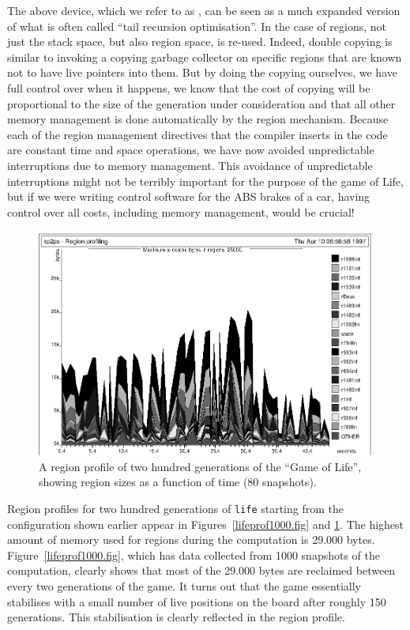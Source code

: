 \documentclass[12pt]{book}
\begin{document}
The above device, which we refer to as , can be seen as a much expanded version of what is
often called ``tail recursion optimisation''.  In the case of regions,
not just the stack space, but also region space, is re-used. Indeed,
double copying is similar to invoking a copying garbage collector on
specific regions that are known not to have live pointers into them.
But by doing the copying ourselves, we have full control over when it
happens, we know that the cost of copying will be proportional to the
size of the generation under consideration and that all other memory
management is done automatically by the region mechanism. Because each
of the region management directives that the compiler inserts in the
code are constant time and space operations, we have now avoided
unpredictable interruptions due to memory management. This avoidance
of unpredictable interruptions might not be terribly important for the
purpose of the game of Life, but if we were writing control software
for the ABS brakes of a car, having control over all costs, including
memory management, would be crucial!
\begin{figure}
\begin{center}
\includegraphics{life80.ps}
\end{center}
\caption{A region profile of two hundred 
generations of the ``Game of Life'', showing
region sizes as a function of time (80 snapshots).}
\label{lifeprof80.fig}
\end{figure}


Region profiles 
for two hundred generations of {\tt life} starting from the configuration
shown earlier appear in Figures~\ref{lifeprof1000.fig} 
and \ref{lifeprof80.fig}.
The highest amount of memory used for regions during the computation is
29.000 bytes. Figure~\ref{lifeprof1000.fig}, which has data collected from 1000 snapshots
of the computation, clearly shows that most of the 29.000 bytes are reclaimed between
every two generations of the game. It turns out that the game essentially stabilises
with a small number of live positions on the board after roughly 150 generations.
This stabilisation is clearly reflected in the region profile.
\end{document}

